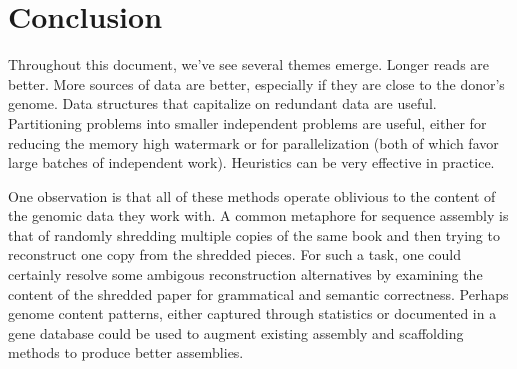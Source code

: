 \section{Conclusion}

Throughout this document, we've see several themes emerge.  Longer reads are better.  More sources of data are better, especially if they are close to the donor's genome.  Data structures that capitalize on redundant data are useful.  Partitioning problems into smaller independent problems are useful, either for reducing the memory high watermark or for parallelization (both of which favor large batches of independent work).  Heuristics can be very effective in practice.

One observation is that all of these methods operate oblivious to the content of the genomic data they work with.  A common metaphore for sequence assembly is that of randomly shredding multiple copies of the same book and then trying to reconstruct one copy from the shredded pieces.  For such a task, one could certainly resolve some ambigous reconstruction alternatives by examining the content of the shredded paper for grammatical and semantic correctness.  Perhaps genome content patterns, either captured through statistics or documented in a gene database could be used to augment existing assembly and scaffolding methods to produce better assemblies.

